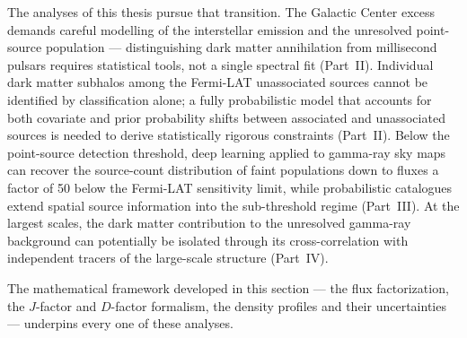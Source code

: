 The analyses of this thesis pursue that transition.
The Galactic Center excess demands careful modelling of the interstellar emission and the unresolved point-source population --- distinguishing dark matter annihilation from millisecond pulsars requires statistical tools, not a single spectral fit (Part~II).
Individual dark matter subhalos among the Fermi-LAT unassociated sources cannot be identified by classification alone; a fully probabilistic model that accounts for both covariate and prior probability shifts between associated and unassociated sources is needed to derive statistically rigorous constraints (Part~II).
Below the point-source detection threshold, deep learning applied to gamma-ray sky maps can recover the source-count distribution of faint populations down to fluxes a factor of 50 below the Fermi-LAT sensitivity limit, while probabilistic catalogues extend spatial source information into the sub-threshold regime (Part~III).
At the largest scales, the dark matter contribution to the unresolved gamma-ray background can potentially be isolated through its cross-correlation with independent tracers of the large-scale structure (Part~IV).

The mathematical framework developed in this section --- the flux factorization, the $J$-factor and $D$-factor formalism, the density profiles and their uncertainties --- underpins every one of these analyses.


